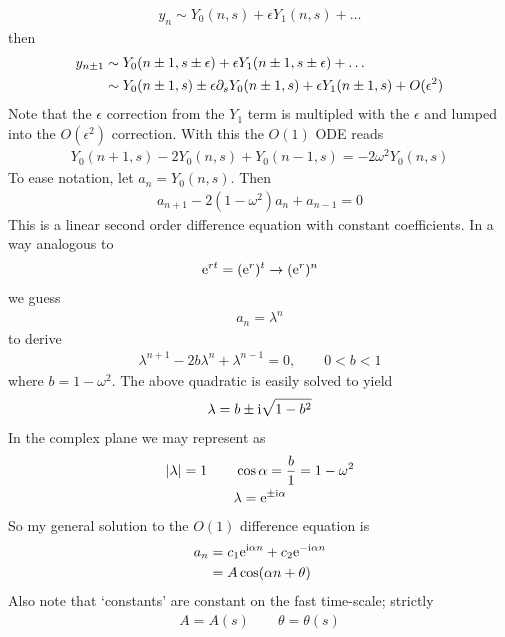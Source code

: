 \begin{gather*}
	y_n \sim Y_0(n,s) + \epsilon Y_1(n,s) + \dots 
\end{gather*}
then
\begin{align*}
	y_{n \pm 1} &\sim Y_0(n\pm 1,s \pm \epsilon) + \epsilon Y_1 (n\pm 1,s\pm \epsilon) + \dots \\
	& \sim Y_0(n\pm 1, s) \pm \epsilon \partial_s Y_0 (n \pm 1,s) + \epsilon Y_1 (n\pm 1, s) + O(\epsilon^2)
\end{align*}
Note that the $\epsilon$ correction from the $Y_1$ term is multipled with the $\epsilon$ and lumped into the $O(\epsilon^2)$ correction. With this the $O(1)$ ODE reads
\begin{align*}
	Y_0(n+1,s) - 2Y_0(n,s) + Y_0(n-1,s) = -2 \omega^2 Y_0(n,s)
\end{align*}
To ease notation, let $a_n = Y_0(n,s)$. Then
\begin{align*}
	a_{n+1} - 2 (1-\omega^2) a_n + a_{n-1} = 0
\end{align*}
This is a linear second order difference equation with constant coefficients. In a way analogous to
\begin{gather*}
	\mathrm{e}^{rt} = (\mathrm{e}^r)^t \rightarrow (\mathrm{e}^r)^n
\end{gather*}
we guess
\begin{gather*}
	a_n = \lambda^n
\end{gather*}
to derive
\begin{gather*}
	\lambda^{n+1} - 2 b \lambda^n + \lambda^{n-1} = 0, \qquad 0<b<1
\end{gather*}
where $b = 1 - \omega^2$. The above quadratic is easily solved to yield
\begin{gather*}
	\lambda = b \pm \mathrm{i} \sqrt{1-b^2}
\end{gather*}
In the complex plane we may represent as
\begin{gather*}
	|\lambda| = 1 \qquad \cos \alpha = \frac{b}{1} = 1 - \omega^2 \\
	\lambda = \mathrm{e}^{\pm \mathrm{i} \alpha }
\end{gather*}
So my general solution to the $O(1)$ difference equation is
\begin{align*}
	a_n &= c_1 \mathrm{e}^{\mathrm{i} \alpha n} + c_2 \mathrm{e}^{-\mathrm{i} \alpha n} \\
	&= A \cos (\alpha n + \theta)
\end{align*}
Also note that `constants' are constant on the fast time-scale; strictly
\begin{gather*}
	A = A(s) \qquad \theta = \theta(s)
\end{gather*}
